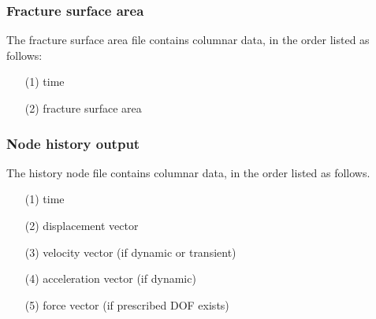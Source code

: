 \subsubsection{Fracture surface area}
The fracture surface area file contains columnar data, in the order listed
as follows: 
\begin{itemize}
\item[(1)] time
\item[(2)] fracture surface area
\end{itemize}

\subsubsection{Node history output}
\label{sect.file.node.history}
The history node file contains columnar data, in the order listed as 
follows. \\
\begin{itemize}
\item[(1)] time
\item[(2)] displacement vector
\item[(3)] velocity vector (if dynamic or transient)
\item[(4)] acceleration vector (if dynamic)
\item[(5)] force vector (if prescribed DOF exists)
\end{itemize}
